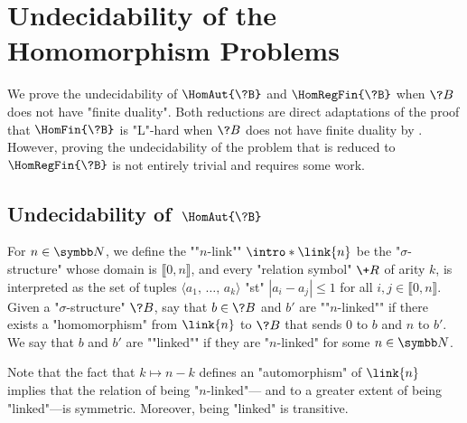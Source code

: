 \section{\AP\label{sec:undecidability}%
	Undecidability of the Homomorphism Problems}


We prove the undecidability of $\HomAut{\?B}$ and $\HomRegFin{\?B}$
when $\?B$ does not have "finite duality". Both reductions are
direct adaptations of the proof that $\HomFin{\?B}$ is "L"-hard when $\?B$ does not
have finite duality by \textcite[Theorem 3.2]{LaroseTesson2009UniversalAlgebraCSP}.
However, proving the undecidability of the problem that is reduced
to $\HomRegFin{\?B}$ is not entirely trivial and requires some work.

\subsection{\AP\label{sec:undecidability-hom}%
	Undecidability of \,$\HomAut{\?B}$}

For $n\in\N$, we define the \AP""$n$-link"" $\intro*\link{n}$ be the "$\sigma$-structure" 
whose domain is $\lBrack 0,n\rBrack$, and every "relation symbol" $\+R$
of arity $k$, is interpreted as the set of tuples $\langle a_1,\, \hdots,\, a_k \rangle$
"st" $|a_i-a_j| \leq 1$ for all $i,j \in \lBrack 0,n \rBrack$.
Given a "$\sigma$-structure" $\?B$, say that $b \in \?B$ and $b'$ are
\AP""$n$-linked"" if there exists a "homomorphism" from $\link{n}$ to $\?B$
that sends $0$ to $b$ and $n$ to $b'$. We say that $b$ and $b'$ are \AP""linked"" if
they are "$n$-linked" for some $n \in \N$.

Note that the fact that $k \mapsto n-k$
defines an "automorphism" of $\link{n}$ implies that the relation of being "$n$-linked"---
and to a greater extent of being "linked"---is symmetric.
Moreover, being "linked" is transitive.


